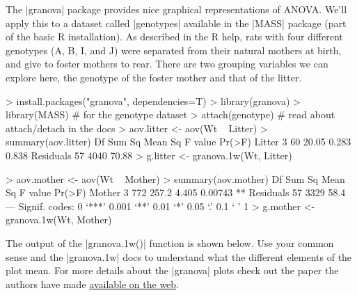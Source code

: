 The |granova| package provides nice graphical representations of ANOVA. We'll apply this to a dataset called |genotypes| available in the |MASS| package (part of the basic R installation).  As described in the R help, rats with four different genotypes (A, B, I, and J) were separated from their natural mothers at birth, and give to foster mothers to rear.  There are two grouping variables we can explore here, the genotype of the foster mother and that of the litter.
\begin{R}
> install.packages("granova", dependencies=T)
> library(granova)
> library(MASS)  # for the genotype dataset
> attach(genotype) # read about attach/detach in the docs
> aov.litter <- aov(Wt ~ Litter)
> summary(aov.litter)
            Df Sum Sq Mean Sq F value Pr(>F)
Litter       3     60   20.05   0.283  0.838
Residuals   57   4040   70.88
> g.litter <- granova.1w(Wt, Litter)


> aov.mother <- aov(Wt ~ Mother)
> summary(aov.mother)
            Df Sum Sq Mean Sq F value  Pr(>F)
Mother       3    772   257.2   4.405 0.00743 **
Residuals   57   3329    58.4
---
Signif. codes:  0 ‘***’ 0.001 ‘**’ 0.01 ‘*’ 0.05 ‘.’ 0.1 ‘ ’ 1
> g.mother <- granova.1w(Wt, Mother)
\end{R}
%


The output of the |granova.1w()| function is shown below. Use your common sense and the |granova.1w| docs to understand what the different elements of the plot mean.  For more details about the |granova| plots check out the paper the authors have made \href{http://rmpruzek.com/wp-content/uploads/2011/07/ElementalGraphicsForANOVA.finalJune11.pdf}{available on the web}.

